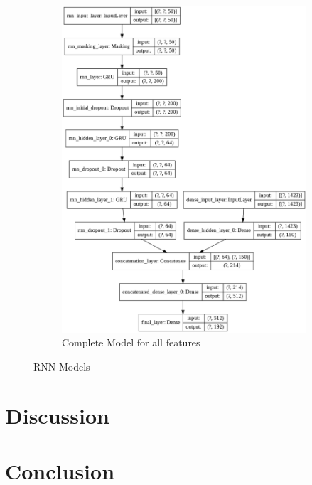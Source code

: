\documentclass[acmsmall]{acmart}
\begin{document}
\begin{figure}[H]
\begin{subfigure}{.5\textwidth}
  \includegraphics[width=.9\linewidth]{assets/AuthorAttributionModel_all_features.png}
  \caption{Complete Model for all features}
    \label{fig:complete_model}
 \end{subfigure}
 \caption{RNN Models}
\label{fig:rnn_models}
\end{figure}


\section{Discussion}

\section{Conclusion}




\end{document}
